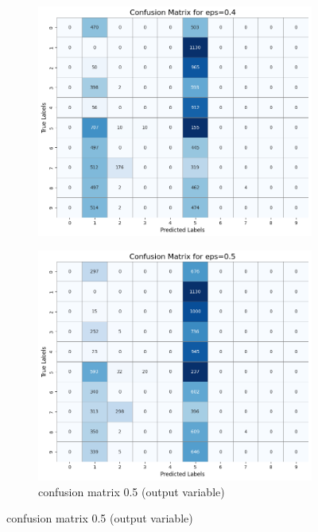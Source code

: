\documentclass[11pt,onside]{article}
\begin{document}
\begin{figure}[h]
  \centering
  \begin{subfigure}[b]{0.49\textwidth}
    \centering
    \includegraphics[width=\textwidth]{V2_images/_correct_labels_confusion_matrix_eps_0.4.png}
 
    \label{fig:image1}
  \end{subfigure}
  \hfill
  \begin{subfigure}[b]{0.49\textwidth}
    \centering
    \includegraphics[width=\textwidth]{V2_images/_correct_labels_confusion_matrix_eps_0.5.png}
    \caption{confusion matrix 0.5 (output variable)}
    \label{fig:image2}
  \end{subfigure}
 
  \label{fig:images}
\end{figure}
\end{document}
